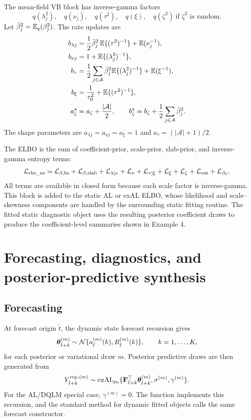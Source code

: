 The mean-field VB block has inverse-gamma factors
\[
q(\lambda_j^2),\quad q(\nu_j),\quad q(\tau^2),\quad q(\xi),
\quad q(\zeta^2)\ \text{if }\zeta^2\text{ is random}.
\]
Let $\bar\beta_j^2=\mathbb{E}_q(\beta_j^2)$. The rate updates are
\begin{align}
b_{\lambda j}
&=\frac{1}{2}\bar\beta_j^2\,\mathbb{E}\{(\tau^2)^{-1}\}
+\mathbb{E}(\nu_j^{-1}),\\
b_{\nu j}
&=1+\mathbb{E}\{(\lambda_j^2)^{-1}\},\\
b_\tau
&=\frac{1}{2}\sum_{j\in\mathcal{A}}\bar\beta_j^2
\mathbb{E}\{(\lambda_j^2)^{-1}\}+\mathbb{E}(\xi^{-1}),\\
b_\xi
&=\frac{1}{\tau_0^2}+\mathbb{E}\{(\tau^2)^{-1}\},\\
a_\zeta^\star
&=a_\zeta+\frac{|\mathcal{A}|}{2},\qquad
b_\zeta^\star=b_\zeta+\frac{1}{2}\sum_{j\in\mathcal{A}}\bar\beta_j^2.
\label{eq:rhs_ns_vb_updates}
\end{align}
The shape parameters are
$a_{\lambda j}=a_{\nu j}=a_\xi=1$ and
$a_\tau=(|\mathcal{A}|+1)/2$.

The  ELBO is the sum of coefficient-prior, scale-prior,
slab-prior, and inverse-gamma entropy terms:
\begin{equation}
\mathcal{L}_{\mathrm{rhs\_ns}}
=
\mathcal{L}_{\beta,\mathrm{hs}}
+\mathcal{L}_{\beta,\mathrm{slab}}
+\mathcal{L}_{\lambda\mid\nu}
+\mathcal{L}_{\nu}
+\mathcal{L}_{\tau\mid\xi}
+\mathcal{L}_{\xi}
+\mathcal{L}_{\zeta}
+\mathcal{L}_{\mathrm{ent}}
+\mathcal{L}_{\beta_0}.
\label{eq:rhs_ns_elbo}
\end{equation}
All terms are available in closed form because each scale factor is
inverse-gamma. This block is added to the static AL or exAL ELBO, whose
likelihood and scale--skewness components are handled by the surrounding
static fitting routine. The fitted static diagnostic object uses the resulting
posterior coefficient draws to produce the coefficient-level summaries shown
in Example 4.

\section{Forecasting, diagnostics, and posterior-predictive synthesis}
\label{sec:forecast_diagnostics_synthesis}

\subsection{Forecasting}

At forecast origin $\tilde t$, the dynamic state forecast recursion gives
\[
\boldsymbol{\theta}_{\tilde t+k}^{(m)}
\sim
\mathcal{N}\{a_{\tilde t}^{(m)}(k),R_{\tilde t}^{(m)}(k)\},
\qquad k=1,\ldots,K,
\]
for each posterior or variational draw $m$. Posterior predictive draws are
then generated from
\begin{equation}
Y_{\tilde t+k}^{\mathrm{rep},(m)}
\sim
\operatorname{exAL}_{p_0}\{
\mathbf{F}_{\tilde t+k}^\top\boldsymbol{\theta}_{\tilde t+k}^{(m)},
\sigma^{(m)},\gamma^{(m)}
\}.
\label{eq:forecast_postpred}
\end{equation}
For the AL/DQLM special case, $\gamma^{(m)}=0$. The function
 implements this recursion, and the standard
 method for dynamic fitted objects calls the same forecast
constructor.

